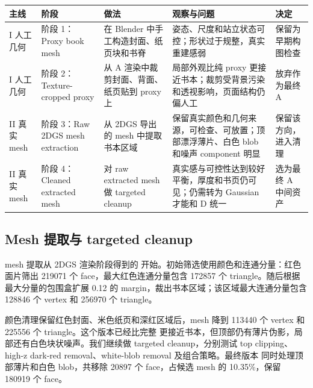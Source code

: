 \documentclass[UTF8,10pt,a4paper]{ctexart}
\let\latexcenter\center
\let\endlatexcenter\endcenter
\renewenvironment{center}{%
  \setlength{\topsep}{0.35em plus 0.08em minus 0.08em}%
  \setlength{\partopsep}{0pt}%
  \latexcenter
}{\endlatexcenter}
\begin{document}
\begin{samepage}
\begin{center}
\label{tab:object_a_route_comparison}
\scriptsize
\begin{tabularx}{\textwidth}{p{} p{} p{} X p{}}
\toprule
主线 & 阶段 & 做法 & 观察与问题 & 决定 \\
\midrule
I 人工几何 & 阶段 1：Proxy book mesh & 在 Blender 中手工构造封面、纸页块和书脊 & 姿态、尺度和站立状态可控；形状过于规整，真实重建感弱 & 保留为早期构图检查 \\
I 人工几何 & 阶段 2：Texture-cropped proxy & 从 A 渲染中裁剪封面、背面、纸页贴到 proxy 上 & 局部外观比纯 proxy 更接近书本；裁剪受背景污染和透视影响，页面结构仍偏人工 & 放弃作为最终 A \\
II 真实 mesh & 阶段 3：Raw 2DGS mesh extraction & 从 2DGS 导出的 mesh 中提取书本区域 & 保留真实颜色和几何来源，可检查、可放置；顶部漂浮薄片、白色 blob 和噪声 component 明显 & 保留该方向，进入清理 \\
II 真实 mesh & 阶段 4：Cleaned extracted mesh & 对 raw extracted mesh 做 targeted cleanup & 真实感与可控性达到较好平衡，厚度和书页仍可见；仍需转为 Gaussian 才能和 D 统一 & 选为最终 A 中间资产 \\
\bottomrule
\end{tabularx}
\end{center}
\end{samepage}

\subsection{Mesh 提取与 targeted cleanup}

mesh 提取从 2DGS 渲染阶段得到的  开始。初始筛选使用颜色和连通分量：红色面片筛出 219071 个 face，最大红色连通分量包含 172857 个 triangle。随后根据最大分量的包围盒扩展 0.12 的 margin，裁出书本区域；该区域最大连通分量包含 128846 个 vertex 和 256970 个 triangle。

颜色清理保留红色封面、米色纸页和深红区域后，mesh 降到 113440 个 vertex 和 225556 个 triangle。这个版本已经比完整  更接近书本，但顶部仍有薄片伪影，局部还有白色块状噪声。我们继续做 targeted cleanup，分别测试 top clipping、high-z dark-red removal、white-blob removal 及组合策略。最终版本  同时处理顶部薄片和白色 blob，共移除 20897 个 face，占候选 mesh 的 10.35\%，保留 180919 个 face。
\end{document}
